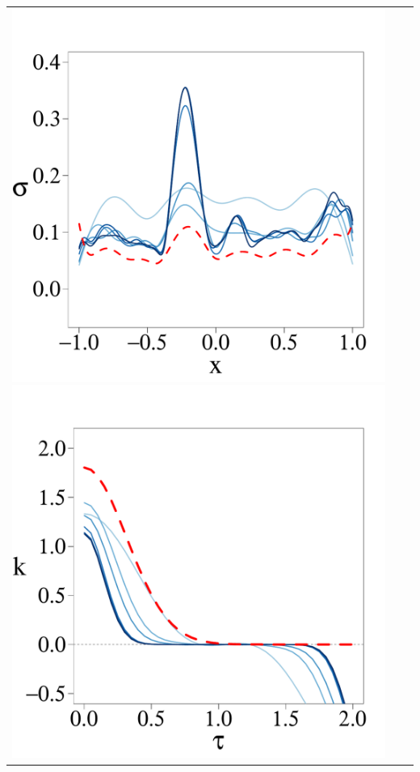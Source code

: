 \documentclass[8pt]{beamer} %
\begin{document}
\begin{frame}
\begin{itemize}
\begin{adjustwidth}{-4.3em}{-3em}
\begin{tabular}{ c c c }
\includegraphics[scale=0.17, trim = 0mm 14mm 0mm 14mm, clip]{ch5_fig3_Sigma_part1.pdf} 
\includegraphics[scale=0.17, trim = 0mm 14mm 5mm 14mm, clip]{ch5_fig3_Cov_part1.pdf} & 

\end{tabular}
\end{adjustwidth}
\end{itemize}
\end{frame}
\end{document}
